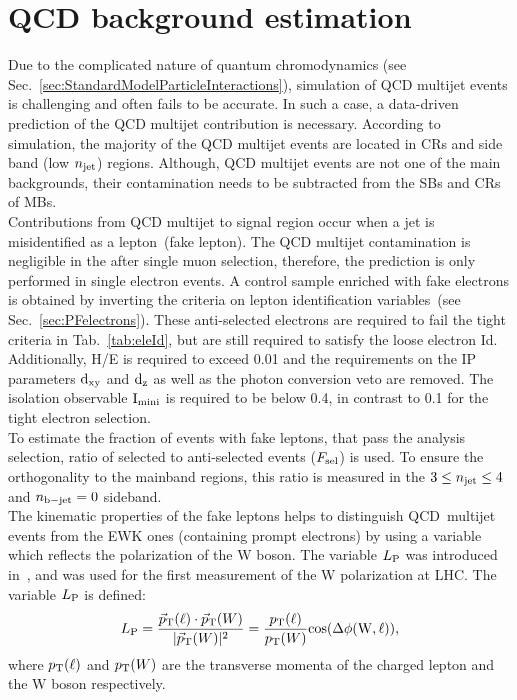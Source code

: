 \section{QCD background estimation}
\label{sec:QCDest}
Due to the complicated nature of quantum chromodynamics (see Sec.~\ref{sec:StandardModelParticleInteractions}), simulation of QCD multijet events is challenging and often fails to be accurate. In such a case, a data-driven prediction of the QCD multijet contribution is necessary.
According to simulation, the majority of the QCD multijet events are located in CRs and side band (low $n_{\rm jet}$) regions.
Although, QCD multijet events are not one of the main backgrounds, their contamination needs to be subtracted from the SBs and CRs of MBs.\\
Contributions from QCD multijet to signal region occur when a jet is misidentified as a lepton~(fake lepton). The QCD multijet contamination is negligible in the after single muon selection, therefore, the prediction is only performed in single electron events. A control sample enriched with fake electrons is obtained by inverting the criteria on lepton identification variables~(see Sec.~\ref{sec:PFelectrons}). These anti-selected electrons are required to fail the tight criteria in Tab.~\ref{tab:eleId}, but are still required to satisfy the loose electron Id.
Additionally, H/E is required to exceed 0.01 and the requirements on the IP parameters $\rm d_{xy}$ and $\rm d_z$ as well as the photon conversion veto are removed. The isolation observable $\rm I_{mini}$ is required to be below 0.4, in contrast to 0.1 for the tight electron selection.\\
To estimate the fraction of events with fake leptons, that pass the analysis selection, ratio of selected to anti-selected events ($F_{\rm sel}$) is used. To ensure the orthogonality to the mainband regions, this ratio is measured in the $3\leq n_{\rm jet}\leq4$ and $n_{\rm b-jet}=0$ sideband.\\
The kinematic properties of the fake leptons helps to distinguish QCD~multijet events from the EWK ones (containing prompt electrons) by using a variable which reflects the polarization of the W boson. The variable $L_{\rm P}$ was introduced in~\cite{LP}, and was used for the first measurement of the W polarization at LHC.
The variable $L_{\rm P}$ is defined:
\begin{equation}
\label{eq:LP}
{\ensuremath{L_{\rm P}}} = \frac{\vec{p}_{\rm T}(\ell)\cdot\vec{p}_{\rm T}(W)}{|\vec{p}_{\rm T}(W)|^2} = \frac{p_{\rm T}(\ell)}{p_{\rm T}(W)} \rm cos(\Delta \phi(W,\ell)),
\end{equation}
where $p_{\rm T}(\ell)$ and $p_{\rm T}(W)$ are the transverse momenta of the charged lepton and the W boson respectively.\\
